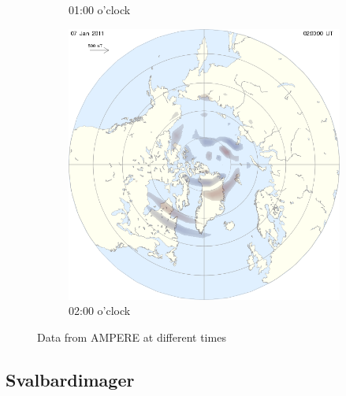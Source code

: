 \documentclass[10pt,a4paper]{article}
\begin{document}
\begin{figure}[h]
\begin{subfigure}{0.3\textwidth}
	\caption{ 01:00 o'clock \label{amp01}}
\end{subfigure}
\begin{subfigure}{0.3\textwidth}
\centering
	\includegraphics[width=\textwidth]{ampere8.png}
	\caption{ 02:00 o'clock \label{amp02}}
\end{subfigure}
\caption{Data from AMPERE at different times}
\end{figure}



\subsection{Svalbardimager}
\end{document}
